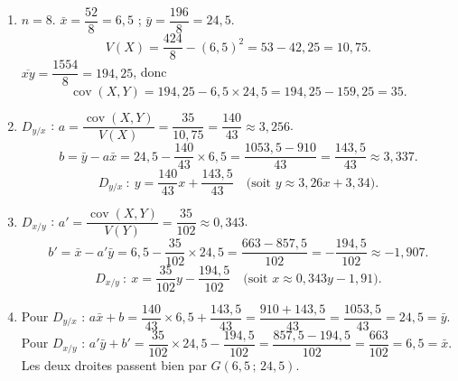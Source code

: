 \documentclass[11pt]{article}
\begin{document}
\begin{corrige}
\begin{enumerate}
\item $n=8$. $\bar{x}=\dfrac{52}{8}=6{,}5$ ; $\bar{y}=\dfrac{196}{8}=24{,}5$.
\[
V(X)=\frac{424}{8}-(6{,}5)^2=53-42{,}25=10{,}75.
\]
$\overline{xy}=\dfrac{1554}{8}=194{,}25$, donc
\[
\operatorname{cov}(X,Y)=194{,}25-6{,}5\times24{,}5=194{,}25-159{,}25=35.
\]
\item $D_{y/x}$ : $a=\dfrac{\operatorname{cov}(X,Y)}{V(X)}=\dfrac{35}{10{,}75}=\dfrac{140}{43}\approx3{,}256$.
\[
b=\bar{y}-a\bar{x}=24{,}5-\frac{140}{43}\times6{,}5=\frac{1053{,}5-910}{43}=\frac{143{,}5}{43}\approx3{,}337.
\]
\[
D_{y/x}\ :\ y=\frac{140}{43}x+\frac{143{,}5}{43}\quad\text{(soit } y\approx3{,}26x+3{,}34\text{)}.
\]
\item $D_{x/y}$ : $a'=\dfrac{\operatorname{cov}(X,Y)}{V(Y)}=\dfrac{35}{102}\approx0{,}343$.
\[
b'=\bar{x}-a'\bar{y}=6{,}5-\frac{35}{102}\times24{,}5=\frac{663-857{,}5}{102}=-\frac{194{,}5}{102}\approx-1{,}907.
\]
\[
D_{x/y}\ :\ x=\frac{35}{102}y-\frac{194{,}5}{102}\quad\text{(soit } x\approx0{,}343y-1{,}91\text{)}.
\]
\item Pour $D_{y/x}$ : $a\bar{x}+b=\dfrac{140}{43}\times6{,}5+\dfrac{143{,}5}{43}=\dfrac{910+143{,}5}{43}=\dfrac{1053{,}5}{43}=24{,}5=\bar{y}$.
Pour $D_{x/y}$ : $a'\bar{y}+b'=\dfrac{35}{102}\times24{,}5-\dfrac{194{,}5}{102}=\dfrac{857{,}5-194{,}5}{102}=\dfrac{663}{102}=6{,}5=\bar{x}$.
Les deux droites passent bien par $G(6{,}5\,;\,24{,}5)$.
\end{enumerate}
\end{corrige}
\end{document}
